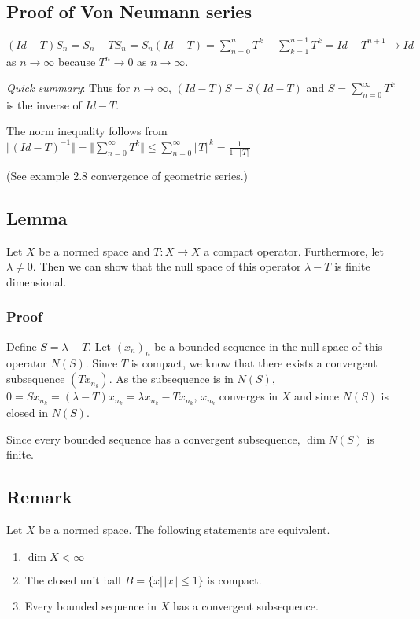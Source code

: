 \documentclass[11pt]{article}
\begin{document}
\subsection{Proof of Von Neumann series}
\label{sec:org59e148b}
\((Id - T)S_n =S_n - TS_n = S_n(Id - T) = \sum_{n=0}^{n} T^k -\sum_{k =
   1}^{n+1} T^k = Id - T^{n+1} \rightarrow Id\) as \(n \rightarrow \infty\) because
\(T^n \rightarrow 0\) as \(n \rightarrow \infty\).

\emph{Quick summary}: Thus for \(n \rightarrow \infty\), \((Id - T)S = S(Id - T)\) and
\(S = \sum_{n=0}^{\infty} T^k\) is the inverse of \(Id - T\).

The norm inequality follows from \(\Vert (Id - T)^{-1}\Vert = \Vert
   \sum_{n=0}^{\infty} T^k \Vert \le \sum_{n=0}^{\infty} \Vert T \Vert^k =
   \frac{1}{1 - \Vert T\Vert}\)

(See example 2.8 convergence of geometric series.)
\subsection{Lemma}
\label{sec:org0d1a21a}
Let \(X\) be a normed space and \(T\colon X \rightarrow X\) a compact operator.
Furthermore, let \(\lambda \neq 0\). Then we can show that the null space of
this operator \(\lambda - T\) is finite dimensional.
\subsubsection{Proof}
\label{sec:org3ace41a}
Define \(S = \lambda - T\). Let \((x_n)_n\) be a bounded sequence in the null
space of this operator \(N(S)\). Since \(T\) is compact, we know that there
exists a convergent subsequence \((Tx_{n_k})\). As the subsequence is in
\(N(S)\), \(0 = Sx_{n_k} = (\lambda - T)x_{n_k} = \lambda x_{n_k} - T x_{n_k}\),
\(x_{n_k}\) converges in \(X\) and since \(N(S)\) is closed in \(N(S)\).

Since every bounded sequence has a convergent subsequence, \(\dim N(S)\) is
finite.
\subsection{Remark}
\label{sec:org631637d}
Let \(X\) be a normed space. The following statements are equivalent.
\begin{enumerate}
\item \(\dim X < \infty\)
\item The closed unit ball \(B = \{x \vert \Vert x \Vert \le 1\}\) is compact.
\item Every bounded sequence in \(X\) has a convergent subsequence.
\end{enumerate}
\end{document}
